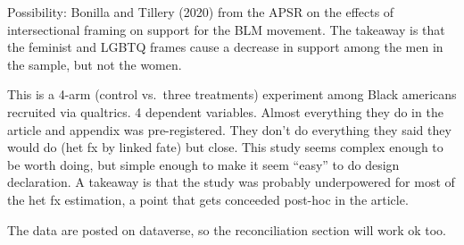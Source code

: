 \documentclass[
]{article}
\begin{document}
Possibility: Bonilla and Tillery (2020) from the APSR on the effects of
intersectional framing on support for the BLM movement. The takeaway is
that the feminist and LGBTQ frames cause a decrease in support among the
men in the sample, but not the women.

This is a 4-arm (control vs.~three treatments) experiment among Black
americans recruited via qualtrics. 4 dependent variables. Almost
everything they do in the article and appendix was pre-registered. They
don't do everything they said they would do (het fx by linked fate) but
close. This study seems complex enough to be worth doing, but simple
enough to make it seem ``easy'' to do design declaration. A takeaway is
that the study was probably underpowered for most of the het fx
estimation, a point that gets conceeded post-hoc in the article.

The data are posted on dataverse, so the reconciliation section will
work ok too.
\end{document}
